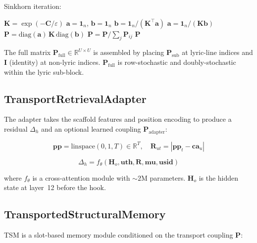 \documentclass[11pt,a4paper]{article}
\begin{document}
Sinkhorn iteration:

\begin{algorithm}[H]
\caption{log-Sinkhorn}
\label{alg:sinkhorn}
\begin{algorithmic}[1]
\State $\mathbf{K} = \exp(-\mathbf{C} / \varepsilon)$
\State $\mathbf{a} = \mathbf{1}_n$, $\mathbf{b} = \mathbf{1}_n$
    \State $\mathbf{b} = \mathbf{1}_n / (\mathbf{K}^\top \mathbf{a})$
    \State $\mathbf{a} = \mathbf{1}_n / (\mathbf{K} \mathbf{b})$
\EndFor
\State $\mathbf{P} = \text{diag}(\mathbf{a}) \, \mathbf{K} \, \text{diag}(\mathbf{b})$
\State $\mathbf{P} = \mathbf{P} / \sum_j \mathbf{P}_{ij}$ 
\State \Return $\mathbf{P}$
\end{algorithmic}
\end{algorithm}

The full matrix $\mathbf{P}_{\text{full}} \in \mathbb{R}^{U \times U}$ is assembled by placing $\mathbf{P}_{\text{sub}}$ at lyric-line indices and $\mathbf{I}$ (identity) at non-lyric indices. $\mathbf{P}_{\text{full}}$ is row-stochastic and doubly-stochastic within the lyric sub-block.

\subsection{TransportRetrievalAdapter}

The adapter takes the scaffold features and position encoding to produce a residual $\Delta_h$ and an optional learned coupling $\mathbf{P}_{\text{adapter}}$:

\begin{equation}
\mathbf{pp} = \text{linspace}(0, 1, T) \in \mathbb{R}^T, \quad
\mathbf{R}_{ut} = |\mathbf{pp}_t - \mathbf{ca}_u|
\end{equation}

\begin{equation}
\Delta_h = f_\theta(\mathbf{H}_o, \mathbf{uth}, \mathbf{R}, \mathbf{mu}, \mathbf{usid})
\end{equation}

where $f_\theta$ is a cross-attention module with ${\sim}2$M parameters. $\mathbf{H}_o$ is the hidden state at layer~12 before the hook.

\subsection{TransportedStructuralMemory}

TSM is a slot-based memory module conditioned on the transport coupling $\mathbf{P}$:
\end{document}
